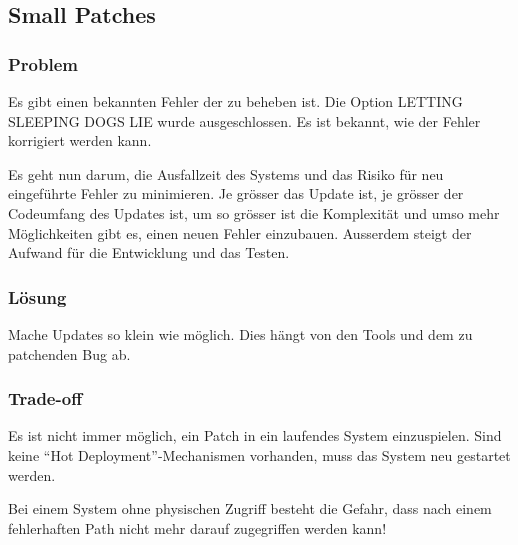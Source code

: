 \subsection{Small Patches}


\subsubsection*{Problem}


Es gibt einen bekannten Fehler der zu beheben ist. Die Option LETTING SLEEPING DOGS LIE wurde ausgeschlossen. Es ist bekannt, wie der Fehler korrigiert werden kann.

Es geht nun darum, die Ausfallzeit des Systems und das Risiko für neu eingeführte Fehler zu minimieren. Je grösser das Update ist, je grösser der Codeumfang des Updates ist, um so grösser ist die Komplexität und umso mehr Möglichkeiten gibt es, einen neuen Fehler einzubauen. Ausserdem steigt der Aufwand für die Entwicklung und das Testen.

\subsubsection*{Lösung}


Mache Updates so klein wie möglich. Dies hängt von den Tools und dem zu patchenden Bug ab.

\subsubsection*{Trade-off}


Es ist nicht immer möglich, ein Patch in ein laufendes System einzuspielen. Sind keine ``Hot Deployment''-Mechanismen vorhanden, muss das System neu gestartet werden.

Bei einem System ohne physischen Zugriff besteht die Gefahr, dass nach einem fehlerhaften Path nicht mehr darauf zugegriffen werden kann!
